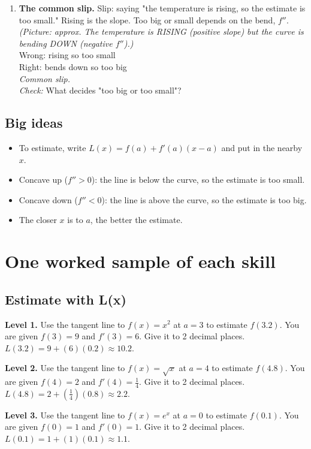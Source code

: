 \documentclass[11pt]{article}
\begin{document}
\begin{enumerate}
\item \textbf{The common slip.} Slip: saying "the temperature is rising, so the estimate is too small." Rising is the slope. Too big or small depends on the bend, $f''$. \textit{(Picture: approx. The temperature is RISING (positive slope) but the curve is bending DOWN (negative $f''$).)}\\ Wrong: rising so too small\\ Right: bends down so too big\\ \textit{Common slip.}\\ \textit{Check:} What decides "too big or too small"? 
\end{enumerate}
\subsection*{Big ideas}\begin{itemize}\item To estimate, write $L(x)=f(a)+f'(a)(x-a)$ and put in the nearby $x$.
\item Concave up ($f''>0$): the line is below the curve, so the estimate is too small.
\item Concave down ($f''<0$): the line is above the curve, so the estimate is too big.
\item The closer $x$ is to $a$, the better the estimate.\end{itemize}
\section*{One worked sample of each skill}
\subsection*{Estimate with L(x)}
\noindent\textbf{Level 1.} Use the tangent line to $f(x)=x^2$ at $a=3$ to estimate $f(3.2)$. You are given $f(3)=9$ and $f'(3)=6$. Give it to 2 decimal places.\\  \quad $L(3.2)=9+(6)(0.2)\approx10.2$.\par\medskip
\noindent\textbf{Level 2.} Use the tangent line to $f(x)=\sqrt{x}$ at $a=4$ to estimate $f(4.8)$. You are given $f(4)=2$ and $f'(4)=\tfrac{1}{4}$. Give it to 2 decimal places.\\  \quad $L(4.8)=2+(\tfrac{1}{4})(0.8)\approx2.2$.\par\medskip
\noindent\textbf{Level 3.} Use the tangent line to $f(x)=e^x$ at $a=0$ to estimate $f(0.1)$. You are given $f(0)=1$ and $f'(0)=1$. Give it to 2 decimal places.\\  \quad $L(0.1)=1+(1)(0.1)\approx1.1$.\par\medskip
\end{document}

